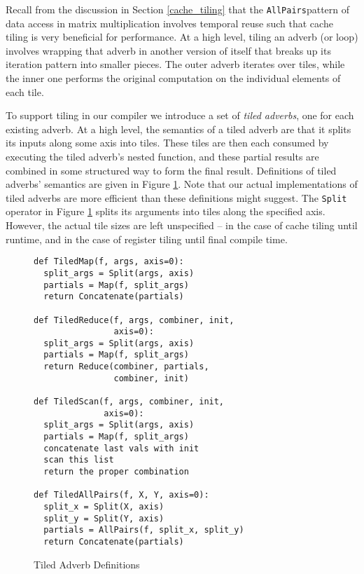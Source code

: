 \documentclass[preprint,9pt]{sigplanconf}
\begin{document}
Recall from the discussion in Section \ref{cache_tiling} that the \lstinline{AllPairs}pattern of data access in matrix multiplication involves temporal reuse such that cache tiling is very beneficial for performance.  At a high level, tiling an adverb (or loop) involves wrapping that adverb in another version of itself that breaks up its iteration pattern into smaller pieces.  The outer adverb iterates over tiles, while the inner one performs the original computation on the individual elements of each tile.

To support tiling in our compiler we introduce a set of \emph{tiled adverbs}, one for each existing adverb.  At a high level, the semantics of a tiled adverb are that it splits its inputs along some axis into tiles.  These tiles are then each consumed by executing the tiled adverb's nested function, and these partial results are combined in some structured way to form the final result.  Definitions of tiled adverbs' semantics are given in Figure \ref{def_tiled_adverbs}.  Note that our actual implementations of tiled adverbs are more efficient than these definitions might suggest.  The \lstinline{Split} operator in Figure \ref{def_tiled_adverbs} splits its arguments into tiles along the specified axis.  However, the actual tile sizes are left unspecified -- in the case of cache tiling until runtime, and in the case of register tiling until final compile time.

\begin{figure}
\label{def_tiled_adverbs}
\begin{lstlisting}[frame=none, backgroundcolor=\color{white}, belowskip=0.3em]
def TiledMap(f, args, axis=0):
  split_args = Split(args, axis)
  partials = Map(f, split_args)
  return Concatenate(partials)

def TiledReduce(f, args, combiner, init,
                axis=0):
  split_args = Split(args, axis)
  partials = Map(f, split_args)
  return Reduce(combiner, partials,
                combiner, init)

def TiledScan(f, args, combiner, init,
              axis=0):
  split_args = Split(args, axis)
  partials = Map(f, split_args)
  concatenate last vals with init
  scan this list
  return the proper combination

def TiledAllPairs(f, X, Y, axis=0):
  split_x = Split(X, axis)
  split_y = Split(Y, axis)
  partials = AllPairs(f, split_x, split_y)
  return Concatenate(partials)
\end{lstlisting}
\caption{Tiled Adverb Definitions}
\end{figure}
\end{document}
